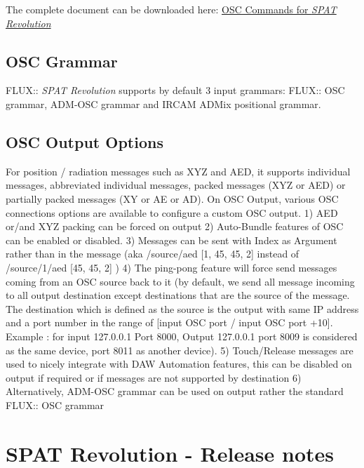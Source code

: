 \documentclass[
  letterpaper,
  DIV=11,
  numbers=noendperiod]{scrreport}
\begin{document}
The complete document can be downloaded here:
\href{https://public.3.basecamp.com/p/fWnQ9D3R2indGgBfHiL2QZZT}{OSC
Commands for \emph{SPAT Revolution}}

\hypertarget{osc-grammar}{%
\section{OSC Grammar}\label{osc-grammar}}

FLUX:: \emph{SPAT Revolution} supports by default 3 input grammars:
FLUX:: OSC grammar, ADM-OSC grammar and IRCAM ADMix positional grammar.

\hypertarget{osc-output-options}{%
\section{OSC Output Options}\label{osc-output-options}}

For position / radiation messages such as XYZ and AED, it supports
individual messages, abbreviated individual messages, packed messages
(XYZ or AED) or partially packed messages (XY or AE or AD). On OSC
Output, various OSC connections options are available to configure a
custom OSC output. 1) AED or/and XYZ packing can be forced on output 2)
Auto-Bundle features of OSC can be enabled or disabled. 3) Messages can
be sent with Index as Argument rather than in the message (aka
/source/aed {[}1, 45, 45, 2{]} instead of /source/1/aed {[}45, 45, 2{]}
) 4) The ping-pong feature will force send messages coming from an OSC
source back to it (by default, we send all message incoming to all
output destination except destinations that are the source of the
message. The destination which is defined as the source is the output
with same IP address and a port number in the range of {[}input OSC port
/ input OSC port +10{]}. Example : for input 127.0.0.1 Port 8000, Output
127.0.0.1 port 8009 is considered as the same device, port 8011 as
another device). 5) Touch/Release messages are used to nicely integrate
with DAW Automation features, this can be disabled on output if required
or if messages are not supported by destination 6) Alternatively,
ADM-OSC grammar can be used on output rather the standard FLUX:: OSC
grammar


\hypertarget{spat-revolution---release-notes}{%
\chapter{SPAT Revolution - Release
notes}\label{spat-revolution---release-notes}}
\end{document}
